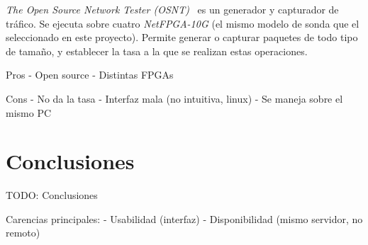 \textit{The Open Source Network Tester (OSNT)}~\cite{osnt} es un generador y capturador de tráfico.
Se ejecuta sobre cuatro \textit{NetFPGA-10G} (el mismo modelo de sonda que el seleccionado en este proyecto).
Permite generar o capturar paquetes de todo tipo de tamaño, y establecer la tasa a la que se realizan estas operaciones.

Pros
- Open source
- Distintas FPGAs

Cons
- No da la tasa
- Interfaz mala (no intuitiva, linux)
- Se maneja sobre el mismo PC

\section{Conclusiones\label{sec:eda:conclusiones}}

TODO: Conclusiones

Carencias principales:
  - Usabilidad (interfaz)
  - Disponibilidad (mismo servidor, no remoto)
